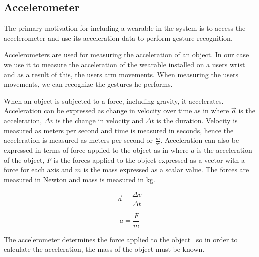 \subsection{Accelerometer}

The primary motivation for including a wearable in the system is to access the accelerometer and use its acceleration data to perform gesture recognition.

Accelerometers are used for measuring the acceleration of an object. In our case we use it to measure the acceleration of the wearable installed on a users wrist and as a result of this, the users arm movements. When measuring the users movements, we can recognize the gestures he performs.

When an object is subjected to a force, including gravity, it accelerates. Acceleration can be expressed as change in velocity over time as in  where $\vec{a}$ is the acceleration, $\Delta v$ is the change in velocity and $\Delta t$ is the duration.
Velocity is measured as meters per second and time is measured in seconds, hence the acceleration is measured as meters per second or $\frac{m}{s^2}$.
Acceleration can also be expressed in terms of force applied to the object as in  where $a$ is the acceleration of the object, $F$ is the forces applied to the object expressed as a vector with a force for each axis and $m$ is the mass expressed as a scalar value.
The forces are measured in Newton and mass is measured in kg.

\begin{centering}
\begin{minipage}{.5\linewidth}
    \begin{equation}
    \vec{a} = \frac{\Delta v}{\Delta t}
    \label{eq:acceleration-delta-velocity}
    \end{equation}
\end{minipage}
\begin{minipage}{.5\linewidth}
    \begin{equation}
    a = \frac{F}{m}
    \label{eq:acceleration-force}
    \end{equation}
\end{minipage}
\end{centering}

The accelerometer determines the force applied to the object~\cite[pp. 392-393]{Fraden:2112745} so in order to calculate the acceleration, the mass of the object must be known.

